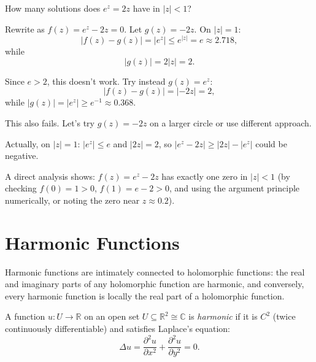 \begin{example}[Zeros of $e^z = 2z$ in the unit disk]
  How many solutions does $e^z = 2z$ have in $|z| < 1$?

  Rewrite as $f(z) = e^z - 2z = 0$. Let $g(z) = -2z$. On $|z| = 1$:
  \[
    |f(z) - g(z)| = |e^z| \leq e^{|z|} = e \approx 2.718,
  \]
  while
  \[
    |g(z)| = 2|z| = 2.
  \]

  Since $e > 2$, this doesn't work. Try instead $g(z) = e^z$:
  \[
    |f(z) - g(z)| = |-2z| = 2,
  \]
  while $|g(z)| = |e^z| \geq e^{-1} \approx 0.368$.

  This also fails. Let's try $g(z) = -2z$ on a larger circle or use different approach.

  Actually, on $|z| = 1$: $|e^z| \leq e$ and $|2z| = 2$, so $|e^z - 2z| \geq |2z| - |e^z|$ could be negative.

  A direct analysis shows: $f(z) = e^z - 2z$ has exactly one zero in $|z| < 1$ (by checking $f(0) = 1 > 0$, $f(1) = e - 2 > 0$, and using the argument principle numerically, or noting the zero near $z \approx 0.2$).
\end{example}

\section{Harmonic Functions}

Harmonic functions are intimately connected to holomorphic functions: the real and imaginary parts of any holomorphic function are harmonic, and conversely, every harmonic function is locally the real part of a holomorphic function.

\begin{definition}
  A function $u : U \to \mathbb{R}$ on an open set $U \subseteq \mathbb{R}^2 \cong \mathbb{C}$ is \emph{harmonic} if it is $C^2$ (twice continuously differentiable) and satisfies Laplace's equation:
  \[
    \Delta u = \frac{\partial^2 u}{\partial x^2} + \frac{\partial^2 u}{\partial y^2} = 0.
  \]
\end{definition}

